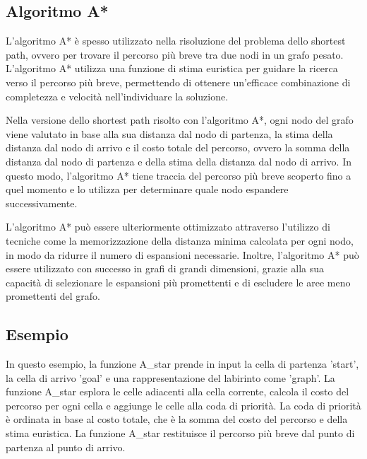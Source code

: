 \subsection{Algoritmo A*}\label{subsec:es_subsec}
L'algoritmo A* è spesso utilizzato nella risoluzione del problema dello shortest path, ovvero per trovare il percorso più breve tra due nodi in un grafo pesato. 
L'algoritmo A* utilizza una funzione di stima euristica per guidare la ricerca verso il percorso più breve, permettendo di ottenere un'efficace combinazione di completezza e velocità nell'individuare la soluzione.

Nella versione dello shortest path risolto con l'algoritmo A*, ogni nodo del grafo viene valutato in base alla sua distanza dal nodo di partenza, la stima della distanza dal nodo di arrivo e il costo totale del percorso, ovvero la somma della distanza dal nodo di partenza e della stima della distanza dal nodo di arrivo. In questo modo, l'algoritmo A* tiene traccia del percorso più breve scoperto fino a quel momento e lo utilizza per determinare quale nodo espandere successivamente.

L'algoritmo A* può essere ulteriormente ottimizzato attraverso l'utilizzo di tecniche come la memorizzazione della distanza minima calcolata per ogni nodo, in modo da ridurre il numero di espansioni necessarie. Inoltre, l'algoritmo A* può essere utilizzato con successo in grafi di grandi dimensioni, grazie alla sua capacità di selezionare le espansioni più promettenti e di escludere le aree meno promettenti del grafo.

\subsection{Esempio}\label{subsec:es_subsec}
In questo esempio, la funzione A\_star prende in input la cella di partenza 'start', la cella di arrivo 'goal' e una rappresentazione del labirinto come 'graph'. La funzione A\_star esplora le celle adiacenti alla cella corrente, calcola il costo del percorso per ogni cella e aggiunge le celle alla coda di priorità. La coda di priorità è ordinata in base al costo totale, che è la somma del costo del percorso e della stima euristica. La funzione A\_star restituisce il percorso più breve dal punto di partenza al punto di arrivo.

